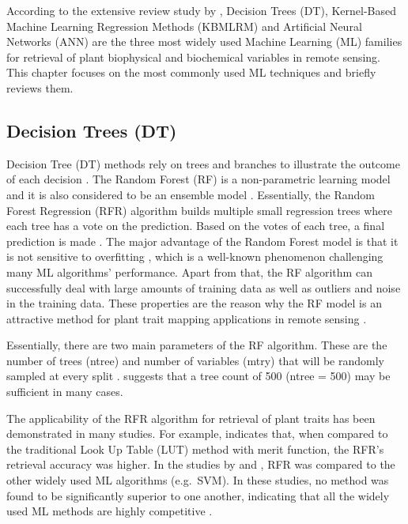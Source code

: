 \documentclass[a4paper, twoside]{templates/ociamthesis}
\begin{document}
According to the extensive review study by \citet{verrelst2019quantifying}, Decision Trees (DT), Kernel-Based Machine Learning Regression Methods (KBMLRM) and Artificial Neural Networks (ANN) are the three most widely used Machine Learning (ML) families for retrieval of plant biophysical and biochemical variables in remote sensing. This chapter focuses on the most commonly used ML techniques and briefly reviews them.

\hypertarget{dt}{%
\subsection{Decision Trees (DT)}\label{dt}}

Decision Tree (DT) methods rely on trees and branches to illustrate the outcome of each decision \citep{verrelst2019quantifying}. The Random Forest (RF) is a non-parametric learning model and it is also considered to be an ensemble model \citep{breiman2001random}. Essentially, the Random Forest Regression (RFR) algorithm builds multiple small regression trees where each tree has a vote on the prediction. Based on the votes of each tree, a final prediction is made \citep{breiman2001random, powell2010quantification}. The major advantage of the Random Forest model is that it is not sensitive to overfitting \citep{breiman2001random, powell2010quantification, verrelst2019quantifying}, which is a well-known phenomenon challenging many ML algorithms' performance. Apart from that, the RF algorithm can successfully deal with large amounts of training data as well as outliers and noise in the training data. These properties are the reason why the RF model is an attractive method for plant trait mapping applications in remote sensing \citep{verrelst2019quantifying}.

Essentially, there are two main parameters of the RF algorithm. These are the number of trees (ntree) and number of variables (mtry) that will be randomly sampled at every split \citep{wang2018estimation}. \citet{breiman2001random} suggests that a tree count of 500 (ntree = 500) may be sufficient in many cases.

The applicability of the RFR algorithm for retrieval of plant traits has been demonstrated in many studies. For example, \citet{ali2020machine} indicates that, when compared to the traditional Look Up Table (LUT) method with merit function, the RFR's retrieval accuracy was higher. In the studies by \citet{han2016hyperspectral} and \citet{pullanagari2016mapping}, RFR was compared to the other widely used ML algorithms (e.g.~SVM). In these studies, no method was found to be significantly superior to one another, indicating that all the widely used ML methods are highly competitive \citep{verrelst2019quantifying}.
\end{document}
